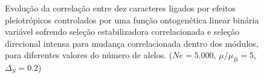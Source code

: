 \begin{figure}[htbp]
    \centering
    \vspace{11pt}
    \vspace{-18pt}
    \vspace{11pt}
    \caption{Evolução da correlação entre dez caracteres ligados por efeitos
        pleiotrópicos controlados por uma função ontogenética linear binária
        variável sofrendo seleção estabilizadora correlacionada e seleção
        direcional intensa para mudança correlacionada dentro dos módulos,
    para diferentes valores do número de alelos. ($Ne=5.000$, $\mu/\mu_B=5$, $\Delta_S=0.2$)}
    \label{MBLR}
\end{figure}
